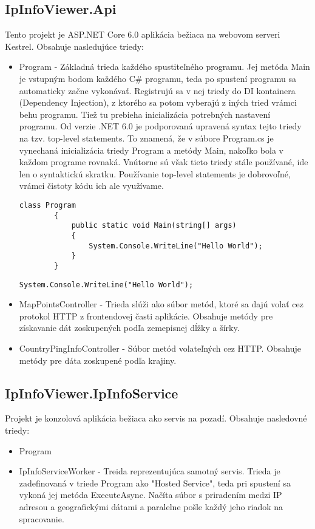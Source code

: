 \subsection{IpInfoViewer.Api}
Tento projekt je ASP.NET Core 6.0 aplikácia bežiaca na webovom serveri Kestrel. Obsahuje nasledujúce triedy: 
\begin{itemize}
    \item Program
    - Základná trieda každého spustiteľného programu. Jej metóda Main je vstupným bodom každého C\# programu, teda po spustení programu sa automaticky 
    začne vykonávať. Registrujú sa v nej triedy do DI kontainera (Dependency Injection), z ktorého sa potom vyberajú z iných tried vrámci behu programu. 
    Tiež tu prebieha inicializácia potrebných nastavení programu. Od verzie .NET 6.0 je podporovaná upravená syntax tejto triedy na tzv. top-level statements. 
    To znamená, že v súbore Program.cs je vynechaná inicializácia triedy Program a metódy Main, nakoľko bola v každom 
    programe rovnaká. Vnútorne sú však tieto triedy stále používané, ide len o syntaktickú skratku. Používanie top-level statements 
    je dobrovoľné, vrámci čistoty kódu ich ale využívame.
    \begin{lstlisting}[float,language={[Sharp]C},caption={Ukážka kódu triedy Program bez použitia top-level statements},label=alg:Program_Old]
        class Program 
        {
            public static void Main(string[] args) 
            {
                System.Console.WriteLine("Hello World");
            }
        }
    \end{lstlisting}
    \begin{lstlisting}[float,language={[Sharp]C},caption={Ukážka kódu triedy Program s použitím top-level statements},label=alg:Program_New]
        System.Console.WriteLine("Hello World");
    \end{lstlisting}
    \item MapPointsController
    - Trieda slúži ako súbor metód, ktoré sa dajú volať cez protokol HTTP z frontendovej časti aplikácie. Obsahuje metódy pre získavanie 
    dát zoskupených podľa zemepisnej dĺžky a šírky.
    \item CountryPingInfoController
    - Súbor metód volateľných cez HTTP. Obsahuje metódy pre dáta zoskupené podľa krajiny.
\end{itemize}
\subsection{IpInfoViewer.IpInfoService}
Projekt je konzolová aplikácia bežiaca ako servis na pozadí. Obsahuje nasledovné triedy:
\begin{itemize}
    \item Program
    \item IpInfoServiceWorker
    - Treida reprezentujúca samotný servis. Trieda je zadefinovaná v triede Program ako "Hosted Service", teda pri spustení sa vykoná jej metóda ExecuteAsync. 
    Načíta súbor s priradením medzi IP adresou a geografickými dátami a paralelne pošle každý jeho riadok na spracovanie.
\end{itemize}
